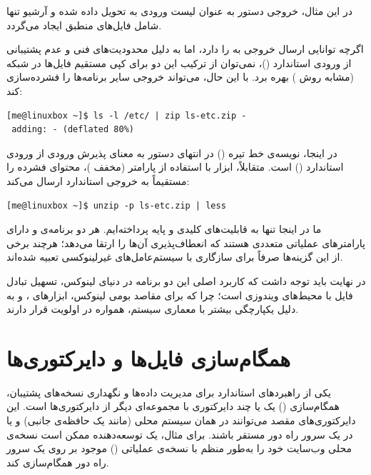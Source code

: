 در این مثال، خروجی دستور  به عنوان لیست ورودی به  تحویل داده شده و آرشیو  تنها شامل فایل‌های منطبق ایجاد می‌گردد.

اگرچه  توانایی ارسال خروجی به  را دارد، اما به دلیل محدودیت‌های فنی و عدم پشتیبانی  از ورودی استاندارد ()، نمی‌توان از ترکیب این دو برای کپی مستقیم فایل‌ها در شبکه (مشابه روش ) بهره برد. با این حال،  می‌تواند خروجی سایر برنامه‌ها را فشرده‌سازی کند:

\begin{latin}
\begin{lstlisting}
[me@linuxbox ~]$ ls -l /etc/ | zip ls-etc.zip -
 adding: - (deflated 80%)
\end{lstlisting}
\end{latin}

در اینجا، نویسه‌ی خط تیره (\cmd{-}) در انتهای دستور به معنای پذیرش ورودی از ورودی استاندارد () است. متقابلاً، ابزار  با استفاده از پارامتر  (مخفف )، محتوای فشرده را مستقیماً به خروجی استاندارد ارسال می‌کند:

\begin{latin}
\begin{lstlisting}
[me@linuxbox ~]$ unzip -p ls-etc.zip | less
\end{lstlisting}
\end{latin}

ما در اینجا تنها به قابلیت‌های کلیدی و پایه پرداخته‌ایم. هر دو برنامه‌ی  و  دارای پارامترهای عملیاتی متعددی هستند که انعطاف‌پذیری آن‌ها را ارتقا می‌دهد؛ هرچند برخی از این گزینه‌ها صرفاً برای سازگاری با سیستم‌عامل‌های غیرلینوکسی تعبیه شده‌اند.

در نهایت باید توجه داشت که کاربرد اصلی این دو برنامه در دنیای لینوکس، تسهیل تبادل فایل با محیط‌های ویندوزی است؛ چرا که برای مقاصد بومی لینوکس، ابزارهای ،  و  به دلیل یکپارچگی بیشتر با معماری سیستم، همواره در اولویت قرار دارند.

\section{همگام‌سازی فایل‌ها و دایرکتوری‌ها}

یکی از راهبردهای استاندارد برای مدیریت داده‌ها و نگهداری نسخه‌های پشتیبان، همگام‌سازی () یک یا چند دایرکتوری با مجموعه‌ای دیگر از دایرکتوری‌ها است. این دایرکتوری‌های مقصد می‌توانند در همان سیستم محلی (مانند یک حافظه‌ی جانبی) و یا در یک سرور راه دور مستقر باشند. برای مثال، یک توسعه‌دهنده ممکن است نسخه‌ی محلی وب‌سایت خود را به‌طور منظم با نسخه‌ی عملیاتی () موجود بر روی یک سرور راه دور همگام‌سازی کند.

